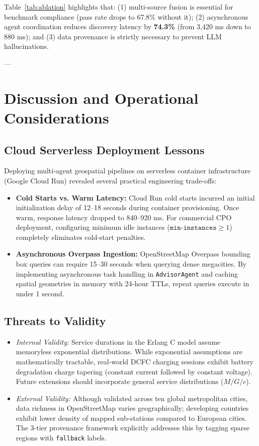 \documentclass[preprint,12pt,authoryear]{elsarticle}
\begin{document}
Table~\ref{tab:ablation} highlights that: (1) multi-source fusion is essential for benchmark compliance (pass rate drops to 67.8\% without it); (2) asynchronous agent coordination reduces discovery latency by \textbf{74.3\%} (from 3,420 ms down to 880 ms); and (3) data provenance is strictly necessary to prevent LLM hallucinations.

---

\section{Discussion and Operational Considerations}
\label{sec:discussion}

\subsection{Cloud Serverless Deployment Lessons}
Deploying multi-agent geospatial pipelines on serverless container infrastructure (Google Cloud Run) revealed several practical engineering trade-offs:
\begin{itemize}
    \item \textbf{Cold Starts vs. Warm Latency:} Cloud Run cold starts incurred an initial initialization delay of 12–18 seconds during container provisioning. Once warm, response latency dropped to 840–920 ms. For commercial CPO deployment, configuring minimum idle instances ($\texttt{min-instances} \ge 1$) completely eliminates cold-start penalties.
    \item \textbf{Asynchronous Overpass Ingestion:} OpenStreetMap Overpass bounding box queries can require 15–30 seconds when querying dense megacities. By implementing asynchronous task handling in \texttt{AdvisorAgent} and caching spatial geometries in memory with 24-hour TTLs, repeat queries execute in under 1 second.
\end{itemize}

\subsection{Threats to Validity}
\begin{itemize}
    \item \textit{Internal Validity:} Service durations in the Erlang C model assume memoryless exponential distributions. While exponential assumptions are mathematically tractable, real-world DCFC charging sessions exhibit battery degradation charge tapering (constant current followed by constant voltage). Future extensions should incorporate general service distributions ($M/G/c$).
    \item \textit{External Validity:} Although validated across ten global metropolitan cities, data richness in OpenStreetMap varies geographically; developing countries exhibit lower density of mapped sub-stations compared to European cities. The 3-tier provenance framework explicitly addresses this by tagging sparse regions with \texttt{fallback} labels.
\end{itemize}
\end{document}
